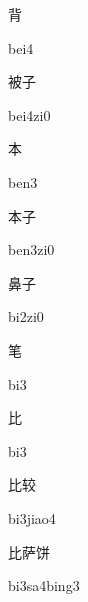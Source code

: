 \begin{multicols*}{2}
\begin{verbete}[bei4]{背}
\begin{pronuncia}{bei4}
\end{pronuncia}
\end{verbete}

\begin{verbete}[bei4zi0]{被子}
\begin{pronuncia}{bei4zi0}
\end{pronuncia}
\end{verbete}

\begin{verbete}[ben3]{本}
\begin{pronuncia}{ben3}
\end{pronuncia}
\end{verbete}

\begin{verbete}[ben3zi0]{本子}
\begin{pronuncia}{ben3zi0}
\end{pronuncia}
\end{verbete}

\begin{verbete}[bi2zi0]{鼻子}
\begin{pronuncia}{bi2zi0}
\end{pronuncia}
\end{verbete}

\begin{verbete}[bi3]{笔}
\begin{pronuncia}{bi3}
\end{pronuncia}
\end{verbete}

\begin{verbete}[bi3]{比}
\begin{pronuncia}{bi3}
\end{pronuncia}
\end{verbete}

\begin{verbete}[bi3jiao4]{比较}
\begin{pronuncia}{bi3jiao4}
\end{pronuncia}
\end{verbete}

\begin{verbete}[bi3sa4bing3]{比萨饼}
\begin{pronuncia}{bi3sa4bing3}
\end{pronuncia}
\end{verbete}


\end{multicols*}
